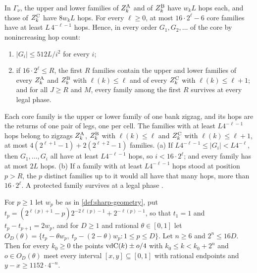 \begin{lemma}\label{lem:sharp-sizes}
In $\Gamma_\nu$, the upper and lower families of $Z^{\mathrm A}_k$ and of $Z^{\mathrm B}_k$ have $w_kL$ hops
each, and those of $Z^{\mathrm C}_k$ have $8w_kL$ hops. For every $\ell\ge0$, at most
$16\cdot2^\ell-6$ core families have at least $L\,4^{-\ell-1}$ hops. Hence, in every order
$G_1,G_2,\dots$ of the core by nonincreasing hop count:
\begin{enumerate}[label=(\alph*)]
\item $|G_i|\le512L/i^2$ for every $i$;
\item if $16\cdot2^\ell\le R$, the first $R$ families contain the upper and lower families
of every $Z^{\mathrm A}_k$ and $Z^{\mathrm B}_k$ with $\ell(k)\le\ell$ and of every $Z^{\mathrm C}_k$ with
$\ell(k)\le\ell+1$; and for all $J\ge R$ and $M$, every family among the first $R$
survives at every legal phase.
\end{enumerate}
\end{lemma}

\begin{outline}
Each core family is the upper or lower family of one bank zigzag, and its hops are the
returns of one pair of legs, one per cell. The families with at least $L4^{-\ell-1}$ hops
belong to zigzags $Z^{\mathrm A}_k$, $Z^{\mathrm B}_k$ with $\ell(k)\le\ell$ and $Z^{\mathrm C}_k$ with
$\ell(k)\le\ell+1$, at most $4(2^{\ell+1}-1)+2(2^{\ell+2}-1)$ families. (a) If
$L4^{-\ell-1}\le|G_i|<L4^{-\ell}$, then $G_1,\dots,G_i$ all have at least $L4^{-\ell-1}$
hops, so $i<16\cdot2^\ell$; and every family has at most $2L$ hops. (b) If a family with
at least $L4^{-\ell-1}$ hops stood at position $p>R$, the $p$ distinct families up to it
would all have that many hops, more than $16\cdot2^\ell$. A protected family survives at a
legal phase \cite[Lemma~2.6]{SourceCovers2026}.
\end{outline}

\begin{lemma}\label{lem:rows}
For $p\ge1$ let $w_p$ be as in \cref{def:sharp-geometry}, put
$t_p=(2^{\ell(p)+1}-p)2^{-2\ell(p)-1}+2^{-\ell(p)-1}$, so that $t_1=1$ and
$t_p-t_{p+1}=2w_p$, and for $D\ge1$ and rational $\theta\in[0,1]$ let
$O_D(\theta)=\{t_p-\theta w_p,\ t_p-(2-\theta)w_p:1\le p\le D\}$. Let $n\ge6$ and
$2^n\le16D$. Then for every $k_0\ge0$ the points $\mathrm{vdC}(k)\pm o/4$ with $k_0\le k<k_0+2^n$
and $o\in O_D(\theta)$ meet every interval $[x,y]\subseteq[0,1]$ with rational endpoints
and $y-x\ge1152\cdot4^{-n}$.
\end{lemma}


